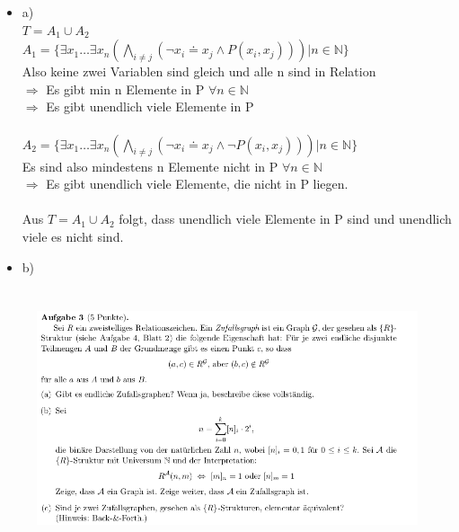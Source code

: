 \documentclass[a4paper]{scrartcl}
\begin{document}
    \begin{itemize}
        \item a)\\
            $T = A_1 \cup A_2$\\
            $A_1 = \{\exists x_1 \dots \exists x_n (\bigwedge_{i \neq j}(\neg x_i \doteq x_j \land P(x_i,x_j))) | n \in \mathds{N}\}$\\
            Also keine zwei Variablen sind gleich und alle n sind in Relation\\
            $\Rightarrow$ Es gibt min n Elemente in P $\forall n \in \mathds{N}$\\
            $\Rightarrow$ Es gibt unendlich viele Elemente in P\\
            \\$A_2 = \{\exists x_1 \dots \exists x_n (\bigwedge_{i \neq j}(\neg x_i \doteq x_j \land \neg P(x_i,x_j))) | n \in \mathds{N}\}$\\
            Es sind also mindestens n Elemente nicht in P $\forall n \in \mathds{N}$\\
            $\Rightarrow$ Es gibt unendlich viele Elemente, die nicht in P liegen.\\
            \\Aus $T = A_1 \cup A_2$ folgt, dass unendlich viele Elemente in P sind und unendlich viele es nicht sind.\\

        \item b)\\

    \end{itemize}


\section*{}%
\label{sec:aufgabe_3}

    \begin{figure}[H]
        \centering
        \includegraphics[scale=0.6]{./A-3.png}
        \label{fig:}
    \end{figure}
\end{document}
